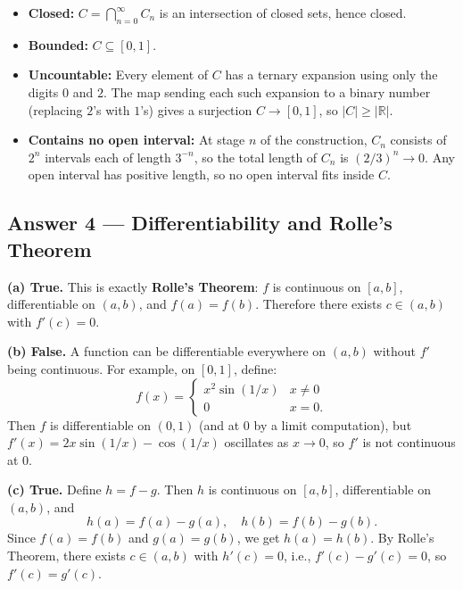 \documentclass[10pt]{article}
\newcommand{\R}{\mathbb{R}}
\begin{document}
\begin{itemize}
  \item \textbf{Closed:} $C = \bigcap_{n=0}^{\infty} C_n$ is an intersection of closed sets, hence closed.
  \item \textbf{Bounded:} $C \subseteq [0,1]$.
  \item \textbf{Uncountable:} Every element of $C$ has a ternary expansion using only the digits $0$ and $2$. The map sending each such expansion to a binary number (replacing $2$'s with $1$'s) gives a surjection $C \to [0,1]$, so $|C| \geq |\R|$.
  \item \textbf{Contains no open interval:} At stage $n$ of the construction, $C_n$ consists of $2^n$ intervals each of length $3^{-n}$, so the total length of $C_n$ is $(2/3)^n \to 0$. Any open interval has positive length, so no open interval fits inside $C$.
\end{itemize}

\subsection{Answer 4 --- Differentiability and Rolle's Theorem}

\textbf{(a) True.} This is exactly \textbf{Rolle's Theorem}: $f$ is continuous on $[a,b]$, differentiable on $(a,b)$, and $f(a) = f(b)$. Therefore there exists $c \in (a,b)$ with $f'(c) = 0$.

\medskip

\textbf{(b) False.} A function can be differentiable everywhere on $(a,b)$ without $f'$ being continuous. For example, on $[0,1]$, define:
$$
f(x) = \begin{cases} x^2 \sin(1/x) & x \neq 0 \\ 0 & x = 0. \end{cases}
$$
Then $f$ is differentiable on $(0,1)$ (and at $0$ by a limit computation), but $f'(x) = 2x\sin(1/x) - \cos(1/x)$ oscillates as $x \to 0$, so $f'$ is not continuous at $0$.

\medskip

\textbf{(c) True.} Define $h = f - g$. Then $h$ is continuous on $[a,b]$, differentiable on $(a,b)$, and
$$
h(a) = f(a) - g(a), \quad h(b) = f(b) - g(b).
$$
Since $f(a) = f(b)$ and $g(a) = g(b)$, we get $h(a) = h(b)$. By Rolle's Theorem, there exists $c \in (a,b)$ with $h'(c) = 0$, i.e., $f'(c) - g'(c) = 0$, so $f'(c) = g'(c)$.

\end{document}
